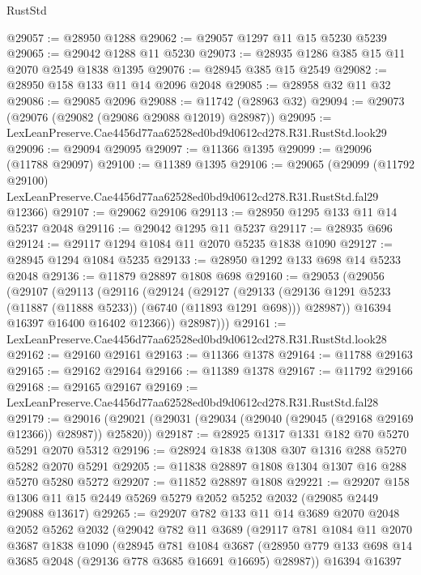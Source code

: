 \begin{lexlean}{RustStd}
\begin{coremodule}
@29057 := @28950 @1288
@29062 := @29057 @1297 @11 @15 @5230 @5239
@29065 := @29042 @1288 @11 @5230
@29073 := @28935 @1286 @385 @15 @11 @2070 @2549 @1838 @1395
@29076 := @28945 @385 @15 @2549
@29082 := @28950 @158 @133 @11 @14 @2096 @2048
@29085 := @28958 @32 @11 @32
@29086 := @29085 @2096
@29088 := @11742 (@28963 @32)
@29094 := @29073 (@29076 (@29082 (@29086 @29088 @12019) @28987))
@29095 := LexLeanPreserve.Cae4456d77aa62528ed0bd9d0612cd278.R31.RustStd.look29
@29096 := @29094 @29095
@29097 := @11366 @1395
@29099 := @29096 (@11788 @29097)
@29100 := @11389 @1395
@29106 := @29065
    (@29099
      (@11792 @29100)
      LexLeanPreserve.Cae4456d77aa62528ed0bd9d0612cd278.R31.RustStd.fal29
      @12366)
@29107 := @29062 @29106
@29113 := @28950 @1295 @133 @11 @14 @5237 @2048
@29116 := @29042 @1295 @11 @5237
@29117 := @28935 @696
@29124 := @29117 @1294 @1084 @11 @2070 @5235 @1838 @1090
@29127 := @28945 @1294 @1084 @5235
@29133 := @28950 @1292 @133 @698 @14 @5233 @2048
@29136 := @11879 @28897 @1808 @698
@29160 := @29053
    (@29056
      (@29107
        (@29113
          (@29116
            (@29124
              (@29127
                (@29133
                  (@29136 @1291 @5233 (@11887 (@11888 @5233)) (@6740 (@11893 @1291 @698)))
                  @28987))
              @16394
              @16397
              @16400
              @16402
              @12366))
          @28987)))
@29161 := LexLeanPreserve.Cae4456d77aa62528ed0bd9d0612cd278.R31.RustStd.look28
@29162 := @29160 @29161
@29163 := @11366 @1378
@29164 := @11788 @29163
@29165 := @29162 @29164
@29166 := @11389 @1378
@29167 := @11792 @29166
@29168 := @29165 @29167
@29169 := LexLeanPreserve.Cae4456d77aa62528ed0bd9d0612cd278.R31.RustStd.fal28
@29179 := @29016 (@29021 (@29031 (@29034 (@29040 (@29045 (@29168 @29169 @12366)) @28987)) @25820))
@29187 := @28925 @1317 @1331 @182 @70 @5270 @5291 @2070 @5312
@29196 := @28924 @1838 @1308 @307 @1316 @288 @5270 @5282 @2070 @5291
@29205 := @11838 @28897 @1808 @1304 @1307 @16 @288 @5270 @5280 @5272
@29207 := @11852 @28897 @1808
@29221 := @29207 @158 @1306 @11 @15 @2449 @5269 @5279 @2052 @5252 @2032 (@29085 @2449 @29088 @13617)
@29265 := @29207
    @782
    @133
    @11
    @14
    @3689
    @2070
    @2048
    @2052
    @5262
    @2032
    (@29042
      @782
      @11
      @3689
      (@29117
        @781
        @1084
        @11
        @2070
        @3687
        @1838
        @1090
        (@28945
          @781
          @1084
          @3687
          (@28950 @779 @133 @698 @14 @3685 @2048 (@29136 @778 @3685 @16691 @16695) @28987))
        @16394
        @16397

\end{coremodule}
\end{lexlean}
